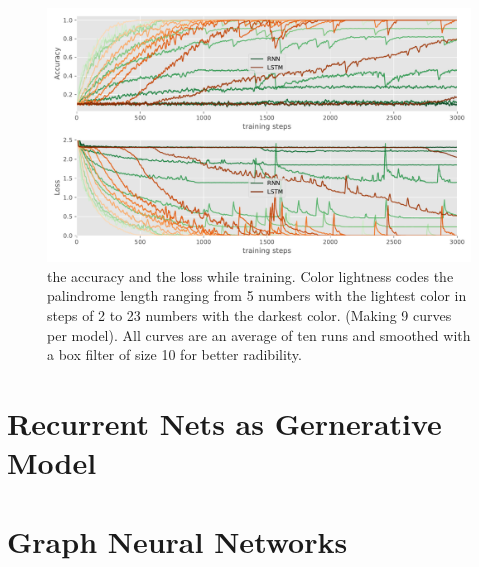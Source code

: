 \documentclass{article}
\begin{document}
\begin{figure}\label{fig:accuracy_loss}
  \centering
  \includegraphics[width=\linewidth]{assignment_2/part1/palindrome.pdf}
  \caption{ the accuracy and  the loss while training.
  Color lightness codes the palindrome length ranging from 5 numbers with the lightest color in steps of 2 to 23 numbers with the darkest color.
  (Making 9 curves per model). All curves are an average of ten runs and smoothed with a box filter of size 10 for better radibility.}
\end{figure}

\section{Recurrent Nets as Gernerative Model}
\subsection{}
\subsubsection{}
\subsubsection{}
\subsubsection{}
\subsection{}

\section{Graph Neural Networks}
\end{document}
